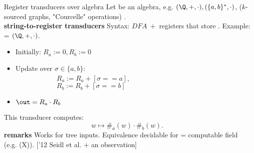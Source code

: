 \begin{frame}{Register transducers over algebra \A}
Let \A be an algebra, e.g. $(\Q, +, \cdot), (\{a, b\}^*, \cdot)$, %
($k$-sourced graphs, "Courcelle" operations)
.\\
\textbf{string-to-\A register transducers} Syntax: $DFA\ + $ registers that store \A. Example: \A = $(\Q, +, \cdot)$.\\
\begin{itemize}
	\item
	Initially: $\boxed{R_a:=0, R_b:=0}$
	\item
	Update over $\sigma\in\{a, b\}$:\\
	$\qquad \qquad  \qquad R_a := R_a + [\sigma == a]$, \\
	$\qquad \qquad  \qquad R_b := R_b+ [\sigma == b]$ 
	\item
	$\out = R_a \cdot R_b$
\end{itemize}
This transducer computes: $$w \mapsto \#_a(w) \cdot \#_b(w).$$
\pause
\textbf{remarks} \pause Works for tree inputs. Equivalence decidable for \A = computable field (e.g. \mbox{\Q(X)}). ['12 Seidl et al. + an observation]
\end{frame}

